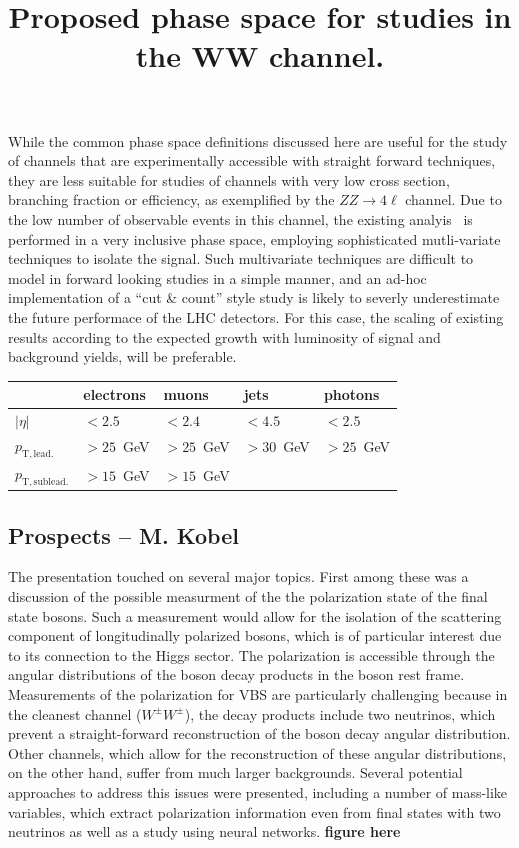 While the common phase space definitions discussed here are useful for the study of channels that are experimentally accessible with straight forward techniques, they are less suitable for studies of channels with very low cross section, branching fraction or efficiency, as exemplified by the $ZZ\rightarrow 4\ell$ channel. Due to the low number of observable events in this channel, the existing analyis~\cite{CMS-PAS-SMP-17-006} is performed in a very inclusive phase space, employing sophisticated mutli-variate techniques to isolate the signal. Such multivariate techniques are difficult to model in forward looking studies in a simple manner, and an ad-hoc implementation of a  ``cut \& count'' style study is likely to severly underestimate the future performace of the LHC detectors. For this case, the scaling of existing results according to the expected growth with luminosity of signal and background yields, will be preferable.

\begin{table}[htb]
\centering
\label{tab:wg2:phasespace}
\title{Proposed phase space for studies in the WW channel.}
\begin{tabular}{|l|l|l|l|l|}
    \hline
             & electrons & muons & jets & photons \\
    \hline
    $|\eta|$ & $<2.5$  & $<2.4$ & $<4.5$ & $<2.5$ \\
    $p_\mathrm{T,lead.}$ & $>25$~GeV & $>25$~GeV &$>30$~GeV &$>25$~GeV\\
    $p_\mathrm{T,sublead.}$ & $>15$~GeV & $>15$~GeV &&\\                            
    \hline
  \end{tabular}  
\end{table}

\subsection{Prospects -- M. Kobel}

The presentation touched on several major topics. First among these was a discussion of the possible measurment of the the polarization state of the final state bosons.
Such a measurement would allow for the isolation of the scattering component of longitudinally polarized bosons, which is of particular interest due to its connection to the Higgs sector.
The polarization is accessible through the angular distributions of the boson decay products in the boson rest frame. 
Measurements of the polarization for VBS are particularly challenging because in the cleanest channel ($W^\pm W^\pm$), the decay products include two neutrinos, which prevent a straight-forward reconstruction of the boson decay angular distribution. Other channels, which allow for the reconstruction of these angular distributions, on the other hand, suffer from much larger backgrounds. Several potential approaches to address this issues were presented, including a number of mass-like variables, which extract polarization information even from final states with two neutrinos as well as a study using neural networks. \textbf{figure here}

